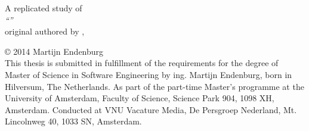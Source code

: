 \null
\vspace{10em}

\begin{center}
	A replicated study of\\[1em]
	\emph{``\repltitle{}''}\rm\\[1em]
	\footnotesize{original authored by \replauthor{}, \citeyear{karus2013}}\rm
\end{center}

\vfill

\noindent\copyright{ 2014} Martijn Endenburg\\[0.3cm]
This thesis is submitted in fulfillment of the requirements for the degree of
Master of Science in Software Engineering by ing. Martijn Endenburg, born in
Hilversum, The Netherlands. As part of the part-time Master's programme at the
University of Amsterdam, Faculty of Science, Science Park 904, 1098 XH,
Amsterdam. Conducted at VNU Vacature Media, De Persgroep Nederland, Mt.
Lincolnweg 40, 1033 SN, Amsterdam.
